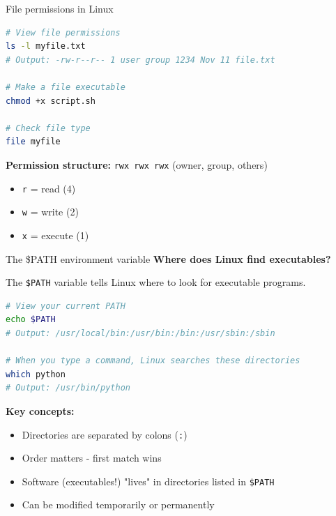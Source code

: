 \documentclass[aspectratio=169]{beamer}
\begin{document}
\begin{frame}[fragile]{File permissions in Linux}
    \begin{lstlisting}[language=bash]
# View file permissions
ls -l myfile.txt
# Output: -rw-r--r-- 1 user group 1234 Nov 11 file.txt

# Make a file executable
chmod +x script.sh

# Check file type
file myfile
\end{lstlisting}
    
    \vspace{0.3cm}
    \textbf{Permission structure:} \texttt{rwx rwx rwx} (owner, group, others)
    \begin{itemize}
        \item \texttt{r} = read (4)
        \item \texttt{w} = write (2)
        \item \texttt{x} = execute (1)
    \end{itemize}
\end{frame}

\begin{frame}[fragile]{The \$PATH environment variable}
    \textbf{Where does Linux find executables?}
    
    The \texttt{\$PATH} variable tells Linux where to look for executable programs.
    
    \begin{lstlisting}[language=bash]
# View your current PATH
echo $PATH
# Output: /usr/local/bin:/usr/bin:/bin:/usr/sbin:/sbin

# When you type a command, Linux searches these directories
which python
# Output: /usr/bin/python
\end{lstlisting}
    
    \vspace{0.3cm}
    \textbf{Key concepts:}
    \begin{itemize}
        \item Directories are separated by colons (\texttt{:})
        \item Order matters - first match wins
        \item Software (executables!) "lives" in directories listed in \texttt{\$PATH}
        \item Can be modified temporarily or permanently
    \end{itemize}
\end{frame}
\end{document}
